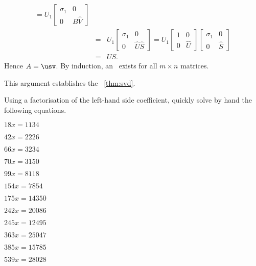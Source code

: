 \begin{enumerate}
\begin{eqnarray*}
=U_1\begin{bmatrix} \sigma_1&0 \\0&B\hat V \end{bmatrix}
\\&=&U_1\begin{bmatrix} \sigma_1&0 \\0&\hat U\hat S \end{bmatrix}
=U_1\begin{bmatrix} 1&0 \\0&\hat U \end{bmatrix}
\begin{bmatrix} \sigma_1&0 \\0&\hat S \end{bmatrix}
\\&=&US.
\end{eqnarray*}
Hence \(A=\usv\). 
By induction, an \svd\ exists for all \(m\times n\) matrices.
\end{enumerate}
This argument establishes the \svd\ \autoref{thm:svd}.







\sectionExercises



\begin{exercise} \label{ex:} 
Using a factorisation of the left-hand side coefficient, quickly solve by hand the following equations.
\begin{parts}
\item \(18 x=1134\)
\item \(42 x=2226\)
\item \(66 x=3234\)
\item \(70 x=3150\)
\item \(99 x=8118\)
\item \(154 x=7854\)
\item \(175 x=14350\)
\item \(242 x=20086\)
\item \(245 x=12495\)
\item \(363 x=25047\)
\item \(385 x=15785\)
\item \(539 x=28028\)
\end{parts}
\end{exercise}




